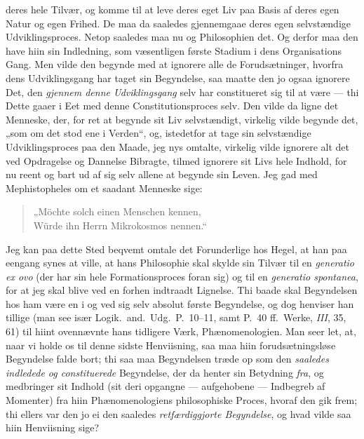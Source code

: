 \documentclass[12pt,a4paper]{book}
\newcommand{\apage}[1]{\marginnote{\footnotesize\textit{[#1]}}}
\begin{document}
deres hele Tilvær, og komme til at leve deres eget Liv paa Basis af
\apage{51} deres egen Natur og egen Frihed. De maa da saaledes gjennemgaae deres
egen selvstændige Udviklingsproces. Netop saaledes maa nu og
Philosophien det. Og derfor maa den have hiin sin Indledning, som
væsentligen første Stadium i dens Organisations Gang. Men vilde den
begynde med at ignorere alle de Forudsætninger, hvorfra dens
Udviklingsgang har taget sin Begyndelse, saa maatte den jo ogsaa
ignorere Det, den \emph{gjennem denne Udviklingsgang} selv har constitueret
sig til at være --- thi Dette gaaer i Eet med denne Constitutionsproces
selv. Den vilde da ligne det Menneske, der, for ret at begynde sit Liv
selvstændigt, virkelig vilde begynde det, „som om det stod ene i
Verden“, og, istedetfor at tage sin selvstændige Udviklingsproces paa
den Maade, jeg nys omtalte, virkelig vilde ignorere alt det ved
Opdragelse og Dannelse Bibragte, tilmed ignorere sit Livs hele Indhold,
for nu reent og bart ud af sig selv allene at begynde sin Leven. Jeg
gad med Mephistopheles om et saadant Menneske sige:

\begin{quote}
„Möchte solch einen Menschen kennen,\\
Würde ihn Herrn Mikrokosmos nennen.“
\end{quote}

Jeg kan paa dette Sted beqvemt omtale det Forunderlige hos Hegel, at
han paa eengang synes at ville, at hans Philosophie skal skylde sin
Tilvær til en \textit{generatio ex ovo} (der har sin hele
Formationsproces foran sig) og til en \textit{generatio spontanea}, for
at jeg skal blive ved en forhen indtraadt Lignelse. Thi baade skal
Begyndelsen hos ham være en i og ved sig selv absolut første
Begyndelse, og dog henviser han tillige (man see især Logik.\ and.\
Udg.\ P.\ 10--11, samt P.\ 40 ff.\ Werke, \textit{III}, 35, 61) til hiint
ovennævnte hans tidligere Værk, Phænomenologien. Man seer let, at, naar
vi holde os til denne sidste Henviisning, saa maa hiin
forudsætningsløse Begyndelse falde bort; thi saa maa Begyndelsen træde
op som den \emph{saaledes indledede og constituerede} Begyndelse, der da
henter sin Betydning \emph{fra}, og medbringer sit Indhold (sit deri opgangne
--- aufgehobene --- \apage{52} Indbegreb af Momenter) fra hiin Phænomenologiens
philosophiske Proces, hvoraf den gik frem; thi ellers var den jo ei den
saaledes \emph{retfærdiggjorte Begyndelse}, og hvad vilde saa hiin Henviisning
sige?
\end{document}

